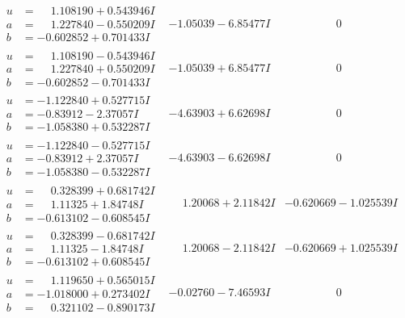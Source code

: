\documentclass[1p]{elsarticle_modified}
\theoremstyle{definition}
\begin{document}
$$\begin{array}{c|c|c}
\begin{aligned}
u &= \phantom{-}1.108190 + 0.543946 I \\
a &= \phantom{-}1.227840 - 0.550209 I \\
b &= -0.602852 + 0.701433 I\end{aligned}
 & -1.05039 - 6.85477 I & \phantom{-0.000000 } 0 \\ \hline\begin{aligned}
u &= \phantom{-}1.108190 - 0.543946 I \\
a &= \phantom{-}1.227840 + 0.550209 I \\
b &= -0.602852 - 0.701433 I\end{aligned}
 & -1.05039 + 6.85477 I & \phantom{-0.000000 } 0 \\ \hline\begin{aligned}
u &= -1.122840 + 0.527715 I \\
a &= -0.83912 - 2.37057 I \\
b &= -1.058380 + 0.532287 I\end{aligned}
 & -4.63903 + 6.62698 I & \phantom{-0.000000 } 0 \\ \hline\begin{aligned}
u &= -1.122840 - 0.527715 I \\
a &= -0.83912 + 2.37057 I \\
b &= -1.058380 - 0.532287 I\end{aligned}
 & -4.63903 - 6.62698 I & \phantom{-0.000000 } 0 \\ \hline\begin{aligned}
u &= \phantom{-}0.328399 + 0.681742 I \\
a &= \phantom{-}1.11325 + 1.84748 I \\
b &= -0.613102 - 0.608545 I\end{aligned}
 & \phantom{-}1.20068 + 2.11842 I & -0.620669 - 1.025539 I \\ \hline\begin{aligned}
u &= \phantom{-}0.328399 - 0.681742 I \\
a &= \phantom{-}1.11325 - 1.84748 I \\
b &= -0.613102 + 0.608545 I\end{aligned}
 & \phantom{-}1.20068 - 2.11842 I & -0.620669 + 1.025539 I \\ \hline\begin{aligned}
u &= \phantom{-}1.119650 + 0.565015 I \\
a &= -1.018000 + 0.273402 I \\
b &= \phantom{-}0.321102 - 0.890173 I\end{aligned}
 & -0.02760 - 7.46593 I & \phantom{-0.000000 } 0\\

\end{array}$$
\end{document}
